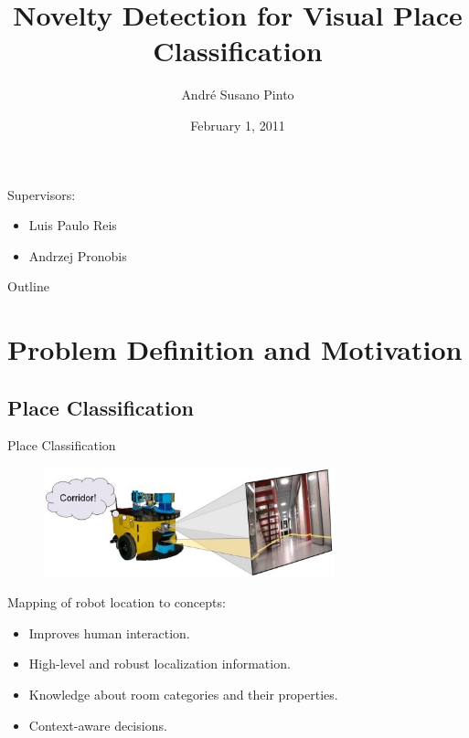 \documentclass[compress]{beamer}
\title{Novelty Detection for Visual Place Classification}
\author{André Susano Pinto\inst{1}}
\date{February 1, 2011}
\institute[FEUP] {
 \inst{1}Faculdade de Engenharia da Universidade do Porto
}
\begin{document}

\begin{frame}
 \titlepage

    Supervisors:
    \begin{itemize}
    \item Luis Paulo Reis
    \item Andrzej Pronobis
    \end{itemize}
\end{frame}

\begin{frame}{Outline}
 \tableofcontents
\end{frame}

\section{Problem Definition and Motivation}
\subsection{Place Classification}
\begin{frame}{Place Classification}
\begin{figure}
\includegraphics[width=0.75\textwidth]{place_classification}
\end{figure}
Mapping of robot location to concepts:
\begin{itemize}
\item Improves human interaction.
\item High-level and robust localization information.
\item Knowledge about room categories and their properties.
\item Context-aware decisions\cite{dey2000towards}.
\end{itemize}
\end{frame}
\end{document}

